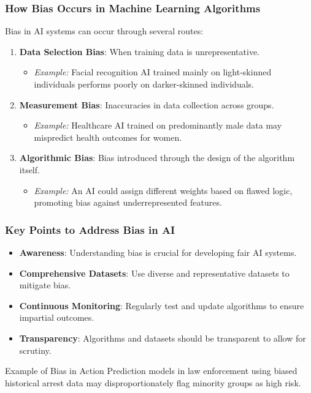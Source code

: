 \documentclass[aspectratio=169]{beamer}
\begin{document}
\begin{frame}[fragile]
    \frametitle{How Bias Occurs in Machine Learning Algorithms}
    Bias in AI systems can occur through several routes:
    
    \begin{enumerate}
        \item \textbf{Data Selection Bias}: When training data is unrepresentative.
            \begin{itemize}
                \item \textit{Example:} Facial recognition AI trained mainly on light-skinned individuals performs poorly on darker-skinned individuals.
            \end{itemize}
        \item \textbf{Measurement Bias}: Inaccuracies in data collection across groups.
            \begin{itemize}
                \item \textit{Example:} Healthcare AI trained on predominantly male data may mispredict health outcomes for women.
            \end{itemize}
        \item \textbf{Algorithmic Bias}: Bias introduced through the design of the algorithm itself.
            \begin{itemize}
                \item \textit{Example:} An AI could assign different weights based on flawed logic, promoting bias against underrepresented features.
            \end{itemize}
    \end{enumerate}
\end{frame}

\begin{frame}[fragile]
    \frametitle{Key Points to Address Bias in AI}
    \begin{itemize}
        \item \textbf{Awareness}: Understanding bias is crucial for developing fair AI systems.
        \item \textbf{Comprehensive Datasets}: Use diverse and representative datasets to mitigate bias.
        \item \textbf{Continuous Monitoring}: Regularly test and update algorithms to ensure impartial outcomes.
        \item \textbf{Transparency}: Algorithms and datasets should be transparent to allow for scrutiny.
    \end{itemize}

    \begin{block}{Example of Bias in Action}
        Prediction models in law enforcement using biased historical arrest data may disproportionately flag minority groups as high risk.
    \end{block}
\end{frame}
\end{document}
